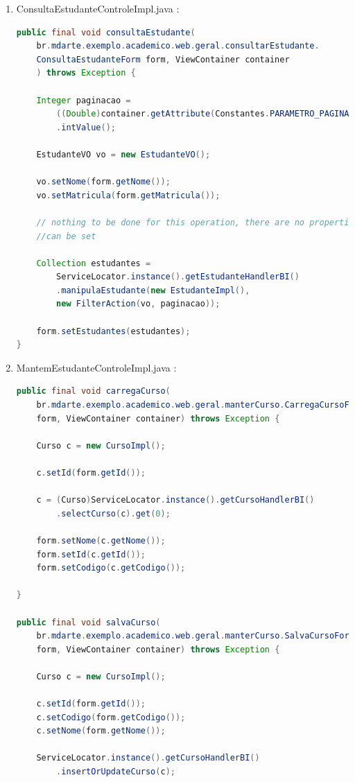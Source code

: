 \begin{enumerate}
\item ConsultaEstudanteControleImpl.java :
\begin{lstlisting}[language=java]
public final void consultaEstudante(
	br.mdarte.exemplo.academico.web.geral.consultarEstudante.
	ConsultaEstudanteForm form, ViewContainer container
	) throws Exception {
    	
    Integer paginacao =
    	((Double)container.getAttribute(Constantes.PARAMETRO_PAGINA))
    	.intValue();
		
    EstudanteVO vo = new EstudanteVO();
    	
    vo.setNome(form.getNome());
    vo.setMatricula(form.getMatricula());
    	
    // nothing to be done for this operation, there are no properties that
    //can be set 
        
    Collection estudantes =
    	ServiceLocator.instance().getEstudanteHandlerBI()
    	.manipulaEstudante(new EstudanteImpl(), 
    	new FilterAction(vo, paginacao));
    	
    form.setEstudantes(estudantes);
}
\end{lstlisting}
		
\item MantemEstudanteControleImpl.java :
\begin{lstlisting}[language=java]
public final void carregaCurso(
	br.mdarte.exemplo.academico.web.geral.manterCurso.CarregaCursoForm 
	form, ViewContainer container) throws Exception {

    Curso c = new CursoImpl();
    	
    c.setId(form.getId());
    	
    c = (Curso)ServiceLocator.instance().getCursoHandlerBI()
    	.selectCurso(c).get(0);

    form.setNome(c.getNome());
    form.setId(c.getId());
    form.setCodigo(c.getCodigo());
    	
}
    	
public final void salvaCurso(
	br.mdarte.exemplo.academico.web.geral.manterCurso.SalvaCursoForm 
	form, ViewContainer container) throws Exception {

    Curso c = new CursoImpl();

	c.setId(form.getId());
	c.setCodigo(form.getCodigo()); 
	c.setNome(form.getNome());

	ServiceLocator.instance().getCursoHandlerBI()
		.insertOrUpdateCurso(c);
    	

\end{lstlisting}
\end{enumerate}
